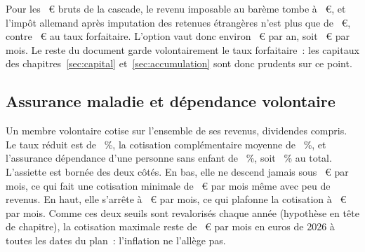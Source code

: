 
Pour les \BruttoNoetig~€ bruts de la cascade, le revenu imposable au bar\`eme tombe \`a
\GuenstigerRevenuImposable~€, et l'imp\^ot allemand apr\`es imputation des retenues \'etrang\`eres
n'est plus que de \GuenstigerImpotTarif~€, contre \ImpotAllemand~€ au taux forfaitaire. L'option vaut
donc environ \GuenstigerEconomieAn~€ par an, soit \GuenstigerEconomieMois~€ par mois. Le reste du
document garde volontairement le taux forfaitaire~: les capitaux des chapitres~\ref{sec:capital} et~\ref{sec:accumulation} sont donc
prudents sur ce point. 

\subsection{Assurance maladie et d\'ependance volontaire}\label{sec:fisc-kv}


Un membre volontaire cotise sur l'ensemble de ses revenus, dividendes compris.
Le taux r\'eduit est de \KvSatz~\%, la cotisation compl\'ementaire moyenne de
\KvZusatz~\%, et l'assurance d\'ependance d'une personne sans enfant de
\PvSatz~\%, soit \KvPvSatz~\% au total. L'assiette est born\'ee des deux
c\^ot\'es. En bas, elle ne descend jamais sous \KvMindestMonat~€ par
mois, ce qui fait une cotisation minimale de \KvPvMinMonat~€ par
mois m\^eme avec peu de revenus. En haut, elle s'arr\^ete \`a \KvBbgMonat~€ par
mois, ce qui plafonne la cotisation \`a \KvPvMaxMonat~€ par mois. Comme ces deux
seuils sont revaloris\'es chaque ann\'ee (hypoth\`ese en t\^ete de chapitre), la cotisation maximale
reste de \KvPvMaxMonat~€ par mois en euros de 2026 \`a toutes les dates du plan~: l'inflation ne
l'all\`ege pas.


